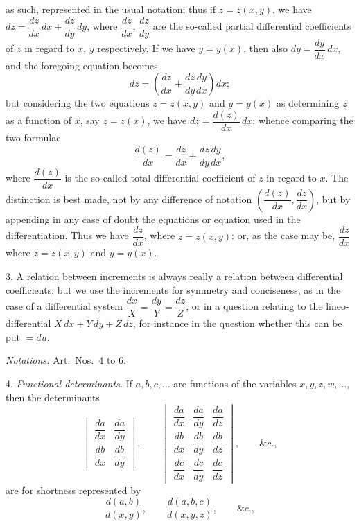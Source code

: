 \documentclass[11pt,a4paper]{article}
\begin{document}
as such, represented in the usual notation; thus if $z = z(x, y)$, we have $dz = \dfrac{dz}{dx}\,dx + \dfrac{dz}{dy}\,dy$, where $\dfrac{dz}{dx}$, $\dfrac{dz}{dy}$ are the so-called partial differential coefficients of $z$ in regard to $x$, $y$ respectively. If we have $y = y(x)$, then also $dy = \dfrac{dy}{dx}\,dx$, and the foregoing equation becomes
\[
dz = \left(\frac{dz}{dx} + \frac{dz}{dy}\frac{dy}{dx}\right) dx;
\]
but considering the two equations $z = z(x, y)$ and $y = y(x)$ as determining $z$ as a function of $x$, say $z = z(x)$, we have $dz = \dfrac{d(z)}{dx}\,dx$; whence comparing the two formulae
\[
\frac{d(z)}{dx} = \frac{dz}{dx} + \frac{dz}{dy}\frac{dy}{dx},
\]
where $\dfrac{d(z)}{dx}$ is the so-called total differential coefficient of $z$ in regard to $x$. The distinction is best made, not by any difference of notation $\left(\dfrac{d(z)}{dx}, \dfrac{dz}{dx}\right)$, but by appending in any case of doubt the equations or equation used in the differentiation. Thus we have $\dfrac{dz}{dx}$, where $z = z(x, y)$: or, as the case may be, $\dfrac{dz}{dx}$ where $z = z(x, y)$ and $y = y(x)$.

3. A relation between increments is always really a relation between differential coefficients; but we use the increments for symmetry and conciseness, as in the case of a differential system $\dfrac{dx}{X} = \dfrac{dy}{Y} = \dfrac{dz}{Z}$, or in a question relating to the lineo-differential $X\,dx + Y\,dy + Z\,dz$, for instance in the question whether this can be put $= du$.

\bigskip

\begin{center}
\emph{Notations.} Art.\ Nos.\ 4 to 6.
\end{center}

\medskip

4. \emph{Functional determinants.} If $a, b, c, \ldots$ are functions of the variables $x, y, z, w, \ldots$, then the determinants
\[
\begin{vmatrix} \dfrac{da}{dx} & \dfrac{da}{dy} \\[1ex] \dfrac{db}{dx} & \dfrac{db}{dy} \end{vmatrix}, \qquad
\begin{vmatrix} \dfrac{da}{dx} & \dfrac{da}{dy} & \dfrac{da}{dz} \\[1ex] \dfrac{db}{dx} & \dfrac{db}{dy} & \dfrac{db}{dz} \\[1ex] \dfrac{dc}{dx} & \dfrac{dc}{dy} & \dfrac{dc}{dz} \end{vmatrix}, \qquad \&c.,
\]
are for shortness represented by
\[
\frac{d(a, b)}{d(x, y)}, \qquad \frac{d(a, b, c)}{d(x, y, z)}, \qquad \&c.,
\]
\end{document}
